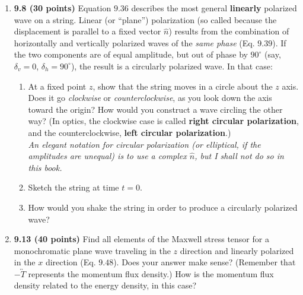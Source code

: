 \documentclass[fleqn]{article}
\begin{document}
  \begin{enumerate}
    \item \textbf{9.8 (30 points)} Equation $9.36$ describes the most general \textbf{linearly} polarized wave on a string. 
    Linear (or “plane”) polarization (so called because the displacement is parallel to a fixed vector $\hat{n}$) results
    from the combination of horizontally and vertically polarized waves of the \emph{same phase} (Eq. $9.39$). If the two 
    components are of equal amplitude, but out of phase by $90^{\circ}$ (say, $\delta_v=0$, $\delta_h=90^{\circ}$), the result is a circularly
    polarized wave. In that case:
    \begin{enumerate}
      \item At a fixed point $z$, show that the string moves in a circle about the $z$ axis. Does it go \emph{clockwise} or 
      \emph{counterclockwise}, as you look down the axis toward the origin? How would you construct a wave circling the 
      other way? (In optics, the clockwise case is called \textbf{right circular polarization}, and the counterclockwise, \textbf{left
      circular polarization}.)
      \\
      \emph{An elegant notation for circular polarization (or elliptical, if the amplitudes are unequal) is to use a
      complex $\hat{n}$, but I shall not do so in this book.}


      \item Sketch the string at time $t = 0$.
      


      \item How would you shake the string in order to produce a circularly polarized wave?
      

    \end{enumerate}


    \item \textbf{9.13 (40 points)} Find all elements of the Maxwell stress tensor for a monochromatic plane wave traveling in the 
    $z$ direction and linearly polarized in the $x$ direction (Eq. $9.48$). Does your answer make sense? (Remember that 
    $-\overleftrightarrow{T}$ represents the momentum flux density.) How is the momentum flux density related to the energy
    density, in this case?


\end{enumerate}
\end{document}
